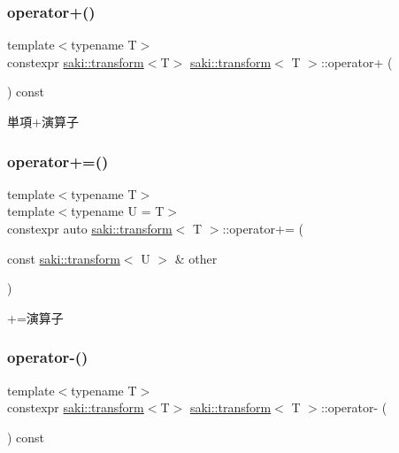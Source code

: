 \subsubsection{\texorpdfstring{operator+()}{operator+()}}
{\footnotesize\ttfamily template$<$typename T$>$ \\
constexpr \mbox{\hyperlink{classsaki_1_1transform}{saki\+::transform}}$<$T$>$ \mbox{\hyperlink{classsaki_1_1transform}{saki\+::transform}}$<$ T $>$\+::operator+ (\begin{DoxyParamCaption}{ }\end{DoxyParamCaption}) const\hspace{0.3cm}{\ttfamily [inline]}}



単項+演算子 

\mbox{\label{classsaki_1_1transform_a6478b00898341e47040560a01f0b9cbc}} 
\subsubsection{\texorpdfstring{operator+=()}{operator+=()}}
{\footnotesize\ttfamily template$<$typename T$>$ \\
template$<$typename U  = T$>$ \\
constexpr auto \mbox{\hyperlink{classsaki_1_1transform}{saki\+::transform}}$<$ T $>$\+::operator+= (\begin{DoxyParamCaption}\item[{const \mbox{\hyperlink{classsaki_1_1transform}{saki\+::transform}}$<$ U $>$ \&}]{other }\end{DoxyParamCaption})\hspace{0.3cm}{\ttfamily [inline]}}



+=演算子 

\mbox{\label{classsaki_1_1transform_aba069deaa467ec2e4ea548b590084916}} 
\subsubsection{\texorpdfstring{operator-\/()}{operator-()}}
{\footnotesize\ttfamily template$<$typename T$>$ \\
constexpr \mbox{\hyperlink{classsaki_1_1transform}{saki\+::transform}}$<$T$>$ \mbox{\hyperlink{classsaki_1_1transform}{saki\+::transform}}$<$ T $>$\+::operator-\/ (\begin{DoxyParamCaption}{ }\end{DoxyParamCaption}) const\hspace{0.3cm}{\ttfamily [inline]}}



